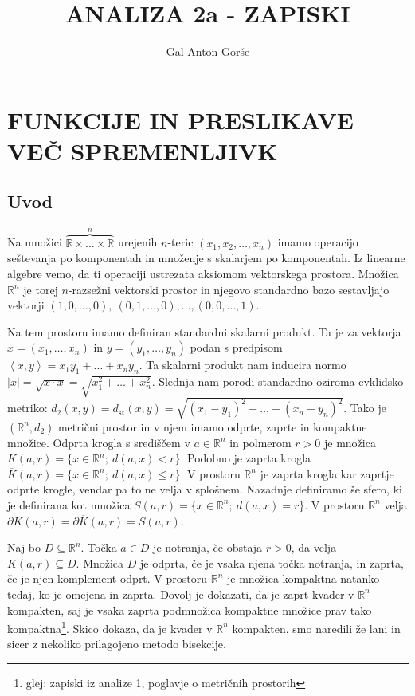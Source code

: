 \documentclass[10pt, a4paper]{article}
\newcommand{\R}{\mathbb {R}}
\newcommand{\sprod}[2]{\left\langle {#1},{#2} \right\rangle}
\begin{document}
\title{ANALIZA 2a - ZAPISKI}
\author{Gal Anton Gorše}
\date{}
\maketitle

\section{FUNKCIJE IN PRESLIKAVE VEČ SPREMENLJIVK}

\subsection{Uvod}

Na množici $\overbrace{\R \times \dots \times \R}^n$ urejenih $n$-teric $(x_1, x_2, \dots, x_n)$
imamo operacijo seštevanja po komponentah in množenje s skalarjem po komponentah. Iz linearne algebre vemo, da 
ti operaciji ustrezata aksiomom vektorskega prostora. Množica $\R^n$ je torej 
$n$-razsežni vektorski prostor in njegovo standardno bazo sestavljajo vektorji $(1, 0, \dots, 0),\ (0, 1, \dots, 0), \dots, (0, 0, \dots, 1)$.

Na tem prostoru imamo definiran standardni skalarni produkt. Ta je za vektorja $x=(x_1, \dots, x_n)$
in $y = (y_1, \dots, y_n)$ podan s predpisom $\sprod{x}{y} = x_1 y_1 + \dots + x_n y_n$.
Ta skalarni produkt nam inducira normo $|x| = \sqrt{x \cdot x} = \sqrt{x_1 ^2 + \dots + x_n^2}$.
Slednja nam porodi standardno oziroma evklidsko metriko: $d_2 (x, y) = d_\mathrm{st} (x, y) = \sqrt{(x_1 - y_1)^2 + \dots + (x_n - y_n)^2}$.
Tako je $(\R^n, d_2)$ metrični prostor in v njem imamo odprte, zaprte in kompaktne množice.
Odprta krogla s središčem v $a \in \R^n$ in polmerom $r > 0$ je množica $K(a, r) = \{x \in \R^n;\ d(a, x) < r\}$.
Podobno je zaprta krogla $\overline{K} (a, r) = \{x \in \R^n;\ d(a, x) \leq r\}$. V prostoru $\R^n$
je zaprta krogla kar zaprtje odprte krogle, vendar pa to ne velja v splošnem.
Nazadnje definiramo še sfero, ki je definirana kot množica $S(a, r) = \{x \in \R^n;\ d(a, x) = r\}$.
V prostoru $\R^n$ velja $\partial K (a, r) = \partial \overline{K}(a, r) = S(a, r)$.

Naj bo $D \subseteq \R^n$. Točka $a \in D$ je notranja, če obstaja $r > 0$, da velja $K(a, r) \subseteq D$.
Množica $D$ je odprta, če je vsaka njena točka notranja, in zaprta, če je njen komplement odprt.
V prostoru $\R^n$ je množica kompaktna natanko tedaj, ko je omejena in zaprta.
Dovolj je dokazati, da je zaprt kvader v $\R^n$ kompakten, saj je vsaka zaprta podmnožica kompaktne množice prav tako kompaktna\footnote{glej: zapiski iz analize 1, poglavje o metričnih prostorih}.
Skico dokaza, da je kvader v $\R^n$ kompakten, smo naredili že lani in sicer z nekoliko prilagojeno metodo bisekcije.
\end{document}
